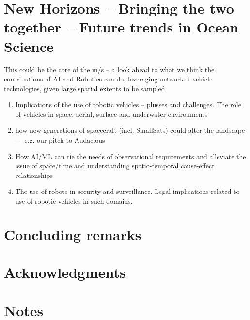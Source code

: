 \documentclass[12pt]{article}
\begin{document}
\section{New Horizons -- Bringing the two together -- Future trends in Ocean Science}

This could be the core of the m/s -- a look ahead to what we think the
contributions of AI and Robotics can do, leveraging networked vehicle
technologies, given large spatial extents to be sampled. 

\begin{enumerate} 

\item Implications of the use of robotic vehicles -- plusses and
  challenges. The role of vehicles in space, aerial, surface and
  underwater environments

\item how new generations of spacecraft (incl. SmallSats) could alter
  the landscape — e.g. our pitch to Audacious
  
\item How AI/ML can tie the needs of observational requirements and
  alleviate the issue of space/time and understanding spatio-temporal
  cause-effect relationships

\item The use of robots in security and surveillance. Legal implications
  related to use of robotic vehicles in such domains. 

\end{enumerate}


\section*{Concluding remarks}








\section*{Acknowledgments}

\section{Notes}




\end{document}
